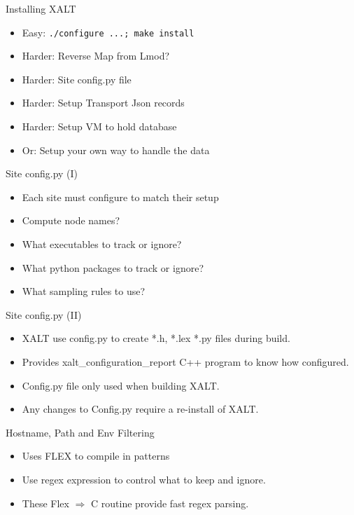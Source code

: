 \documentclass{beamer}
\begin{document}
\begin{frame}{Installing XALT}
  \begin{itemize}
    \item Easy: \texttt{./configure ...; make install}
    \item Harder: Reverse Map from Lmod?
    \item Harder: Site config.py file
    \item Harder: Setup Transport Json records
    \item Harder: Setup VM to hold database
    \item Or: Setup your own way to handle the data
  \end{itemize}
\end{frame}

\begin{frame}{Site config.py (I)}
  \begin{itemize}
    \item Each site must configure to match their setup
    \item Compute node names?
    \item What executables to track or ignore?
    \item What python packages to track or ignore?
    \item What sampling rules to use?
  \end{itemize}
\end{frame}

\begin{frame}{Site config.py (II)}
  \begin{itemize}
    \item XALT use config.py to create *.h, *.lex *.py files during build.
    \item Provides xalt\_configuration\_report C++ program to know how configured.
    \item Config.py file only used when building XALT.
    \item Any changes to Config.py require a re-install of XALT.
  \end{itemize}
\end{frame}

\begin{frame}{Hostname, Path and Env Filtering}
  \begin{itemize}
    \item Uses FLEX to compile in patterns
    \item Use regex expression to control what to keep and ignore.
    \item These Flex $\Rightarrow$ C routine provide fast regex parsing.
  \end{itemize}
\end{frame}
\end{document}
